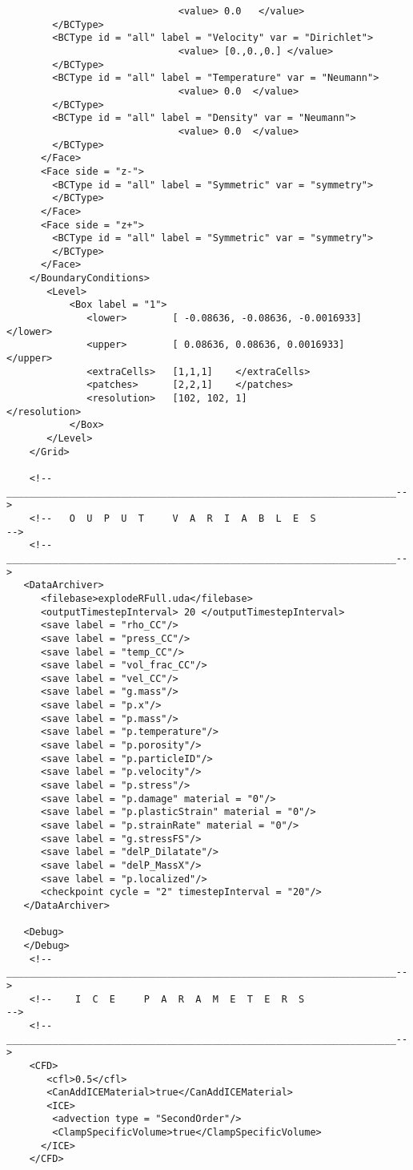 \begin{verbatim}
                              <value> 0.0   </value>
        </BCType>
        <BCType id = "all" label = "Velocity" var = "Dirichlet">
                              <value> [0.,0.,0.] </value>
        </BCType>
        <BCType id = "all" label = "Temperature" var = "Neumann">
                              <value> 0.0  </value>
        </BCType>
        <BCType id = "all" label = "Density" var = "Neumann">
                              <value> 0.0  </value>
        </BCType>
      </Face>
      <Face side = "z-">
        <BCType id = "all" label = "Symmetric" var = "symmetry">
        </BCType>
      </Face>                  
      <Face side = "z+">
        <BCType id = "all" label = "Symmetric" var = "symmetry">
        </BCType>
      </Face>
    </BoundaryConditions>
       <Level>
           <Box label = "1">
              <lower>        [ -0.08636, -0.08636, -0.0016933] </lower>
              <upper>        [ 0.08636, 0.08636, 0.0016933]    </upper>
              <extraCells>   [1,1,1]    </extraCells>
              <patches>      [2,2,1]    </patches>
              <resolution>   [102, 102, 1]                 </resolution>
           </Box>
       </Level>
    </Grid>
   
    <!--____________________________________________________________________-->
    <!--   O  U  P  U  T     V  A  R  I  A  B  L  E  S                      -->
    <!--____________________________________________________________________-->
   <DataArchiver>
      <filebase>explodeRFull.uda</filebase>
      <outputTimestepInterval> 20 </outputTimestepInterval>
      <save label = "rho_CC"/>
      <save label = "press_CC"/>
      <save label = "temp_CC"/>
      <save label = "vol_frac_CC"/>
      <save label = "vel_CC"/>
      <save label = "g.mass"/>
      <save label = "p.x"/>
      <save label = "p.mass"/>
      <save label = "p.temperature"/>
      <save label = "p.porosity"/>
      <save label = "p.particleID"/>
      <save label = "p.velocity"/>
      <save label = "p.stress"/>
      <save label = "p.damage" material = "0"/>
      <save label = "p.plasticStrain" material = "0"/>
      <save label = "p.strainRate" material = "0"/>
      <save label = "g.stressFS"/>
      <save label = "delP_Dilatate"/>
      <save label = "delP_MassX"/>
      <save label = "p.localized"/>
      <checkpoint cycle = "2" timestepInterval = "20"/>
   </DataArchiver>

   <Debug>
   </Debug>
    <!--____________________________________________________________________-->
    <!--    I  C  E     P  A  R  A  M  E  T  E  R  S                        -->
    <!--____________________________________________________________________-->
    <CFD>
       <cfl>0.5</cfl>
       <CanAddICEMaterial>true</CanAddICEMaterial>
       <ICE>
        <advection type = "SecondOrder"/>
        <ClampSpecificVolume>true</ClampSpecificVolume>
      </ICE>        
    </CFD>


\end{verbatim}
